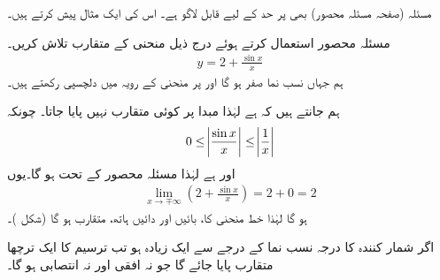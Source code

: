 مسئلہ  (صفحہ  مسئلہ محصور) بھی  پر حد کے لیے قابل لاگو ہے۔ اس کی ایک مثال پیش کرتے ہیں۔


مسئلہ محصور استعمال کرتے ہوئے درج ذیل منحنی کے متقارب تلاش کریں۔
\begin{align*}
y=2+\frac{\sin x}{x}
\end{align*}
ہم  جہاں نسب نما صفر ہو گا اور  پر منحنی کے رویہ   میں دلچسپی رکھتے ہیں۔

ہم جانتے ہیں کہ  ہے لہٰذا مبدا پر کوئی متقارب نہیں پایا جاتا۔ چونکہ
\begin{align*}
0\le \abs{\frac{\sin x}{x}}\le \abs{\frac{1}{x}}
\end{align*}
اور  ہے لہٰذا مسئلہ محصور کے تحت  ہو گا۔یوں 
\begin{align*}
\lim_{x\to \mp\infty}(2+\frac{\sin x}{x})=2+0=2
\end{align*}
ہو گا لہٰذا  خط   منحنی کا، بائیں اور دائیں  ہاتھ، متقارب ہو گا (شکل )۔

اگر شمار کنندہ کا درجہ نسب نما کے درجے سے ایک زیادہ ہو تب ترسیم کا ایک ترچھا متقارب پایا جائے گا جو نہ  افقی اور نہ انتصابی ہو گا۔


